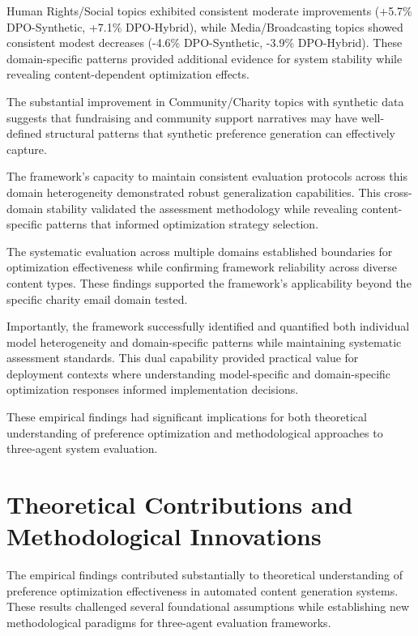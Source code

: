 Human Rights/Social topics exhibited consistent moderate improvements (+5.7\% DPO-Synthetic, +7.1\% DPO-Hybrid), while Media/Broadcasting topics showed consistent modest decreases (-4.6\% DPO-Synthetic, -3.9\% DPO-Hybrid). These domain-specific patterns provided additional evidence for system stability while revealing content-dependent optimization effects.

The substantial improvement in Community/Charity topics with synthetic data suggests that fundraising and community support narratives may have well-defined structural patterns that synthetic preference generation can effectively capture.

The framework's capacity to maintain consistent evaluation protocols across this domain heterogeneity demonstrated robust generalization capabilities. This cross-domain stability validated the assessment methodology while revealing content-specific patterns that informed optimization strategy selection.

The systematic evaluation across multiple domains established boundaries for optimization effectiveness while confirming framework reliability across diverse content types. These findings supported the framework's applicability beyond the specific charity email domain tested.

Importantly, the framework successfully identified and quantified both individual model heterogeneity and domain-specific patterns while maintaining systematic assessment standards. This dual capability provided practical value for deployment contexts where understanding model-specific and domain-specific optimization responses informed implementation decisions.

These empirical findings had significant implications for both theoretical understanding of preference optimization and methodological approaches to three-agent system evaluation.

\section{Theoretical Contributions and Methodological Innovations}
\label{sec:theoretical-contributions}

The empirical findings contributed substantially to theoretical understanding of preference optimization effectiveness in automated content generation systems. These results challenged several foundational assumptions while establishing new methodological paradigms for three-agent evaluation frameworks.

